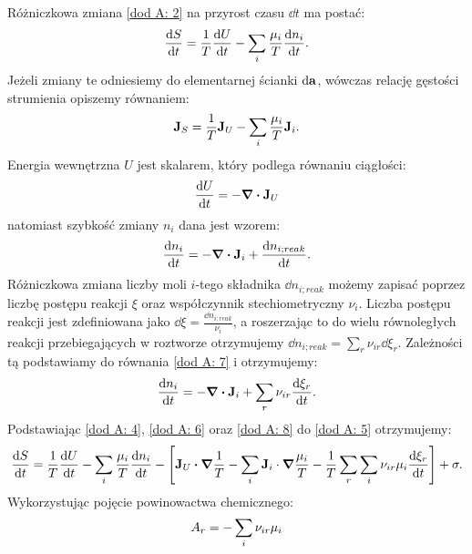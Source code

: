 \documentclass[10pt, a4paper, twoside, onecolumn]{article}
\numberwithin{equation}{section}
\begin{document}
	Różniczkowa zmiana \eqref{dod A: 2} na przyrost czasu \(\dd{t}\) ma postać:
	\begin{equation}
		\dv{S}{t}=\frac{1}{T}\dv{U}{t}-\sum_{i}\frac{\mu_{i}}{T}\dv{n_{i}}{t}. \label{dod A: 3}
	\end{equation}
	Jeżeli zmiany te odniesiemy do elementarnej ścianki \(\dd{\vb{a}}\), wówczas relację gęstości strumienia opiszemy równaniem:
	\begin{equation}
		\vb{J}_{S}=\frac{1}{T}\vb{J}_{U}-\sum_{i}\frac{\mu_{i}}{T}\vb{J}_{i}. \label{dod A: 4}
	\end{equation}
	Energia wewnętrzna $U$ jest skalarem, który podlega równaniu ciągłości:
	\begin{equation}
		\dv{U}{t}=-\div{\vb{J}_{U}} \label{dod A: 6}
	\end{equation}
	natomiast szybkość zmiany $n_{i}$ dana jest wzorem:
	\begin{equation}
		\dv{n_{i}}{t}=-\div{\vb{J}_{i}}+\dv{n_{i;reak}}{t}. \label{dod A: 7}
	\end{equation}
	Różniczkowa zmiana liczby moli $i$-tego składnika \(\dd{n_{i;reak}}\) możemy zapisać poprzez liczbę postępu reakcji $\xi$ oraz współczynnik stechiometryczny $\nu_{i}$. Liczba postępu reakcji jest zdefiniowana jako \(\dd{\xi}=\frac{\dd{n_{i;reak}}}{\nu_{i}}\), a roszerzając to do wielu równoległych reakcji przebiegających w roztworze otrzymujemy \(\dd{n_{i;reak}}=\sum\limits_{r}\nu_{ir}\dd{\xi_{r}}\). Zależności tą podstawiamy do równania \eqref{dod A: 7} i otrzymujemy:
	\begin{equation}
		\dv{n_{i}}{t}=-\div{\vb{J}_{i}}+\sum_{r}\nu_{ir}\dv{\xi_{r}}{t}. \label{dod A: 8}
	\end{equation}
	Podstawiając \eqref{dod A: 4}, \eqref{dod A: 6} oraz \eqref{dod A: 8} do \eqref{dod A: 5} otrzymujemy: 
	\begin{equation} \label{dod A: 9}
		\dv{S}{t}=\frac{1}{T}\dv{U}{t}-\sum_{i}\frac{\mu_{i}}{T}\dv{n_{i}}{t}-\left[\vb{J}_{U}\vdot\grad{\frac{1}{T}}-\sum_{i}\vb{J}_{i}\cdot\grad{\frac{\mu_{i}}{T}}-\frac{1}{T}\sum_{r}\sum_{i}\nu_{ir}\mu_{i}\dv{\xi_{r}}{t}\right]+\sigma.
	\end{equation}
	Wykorzystując pojęcie powinowactwa chemicznego: 
	\begin{equation}
		A_{r}=-\sum_{i}\nu_{ir}\mu_{i} \\
	\end{equation}
\end{document}
